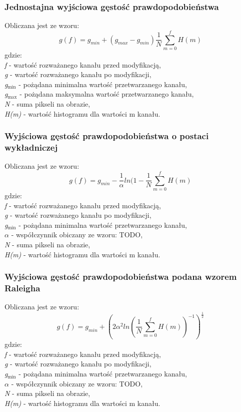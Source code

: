\documentclass{classrep}
\begin{document}
\subsubsection{Jednostajna wyjściowa gęstość prawdopodobieństwa}
Obliczana jest ze wzoru:
\[ g(f) = g_{min} + (g_{max} - g_{min}) \frac{1}{N} \displaystyle\sum_{m=0}^{f} H(m) \]
gdzie:\\
\textit{f} - wartość rozważanego kanału przed modyfikacją,\\
\textit{g} - wartość rozważanego kanału po modyfikacji,\\
\textit{g$_{\text{min}}$} - pożądana minimalna wartość przetwarzanego kanału,\\
\textit{g$_{\text{max}}$} - pożądana maksymalna wartość przetwarzanego kanału,\\
\textit{N} - suma pikseli na obrazie,\\
\textit{H(m)} - wartość histogramu dla wartości m kanału.\\

\subsubsection{Wyjściowa gęstość prawdopodobieństwa o postaci wykładniczej}
Obliczana jest ze wzoru:
\[ g(f) = g_{min} - \frac{1}{\alpha} ln (1 - \frac{1}{N} \displaystyle\sum_{m=0}^{f} H(m) \]
gdzie:\\
\textit{f} - wartość rozważanego kanału przed modyfikacją,\\
\textit{g} - wartość rozważanego kanału po modyfikacji,\\
\textit{g$_{\text{min}}$} - pożądana minimalna wartość przetwarzanego kanału,\\
\textit{$\alpha$} - współczynnik obiczany ze wzoru: TODO,\\
\textit{N} - suma pikseli na obrazie,\\
\textit{H(m)} - wartość histogramu dla wartości m kanału.\\

\subsubsection{Wyjściowa gęstość prawdopodobieństwa podana wzorem Raleigha}
Obliczana jest ze wzoru:
\[ g(f) = g_{min} + (2 \alpha^2 ln (\frac{1}{N} \displaystyle\sum_{m=0}^{f} H(m))^{-1})^\frac{1}{2} \]
gdzie:\\
\textit{f} - wartość rozważanego kanału przed modyfikacją,\\
\textit{g} - wartość rozważanego kanału po modyfikacji,\\
\textit{g$_{\text{min}}$} - pożądana minimalna wartość przetwarzanego kanału,\\
\textit{$\alpha$} - współczynnik obiczany ze wzoru: TODO,\\
\textit{N} - suma pikseli na obrazie,\\
\textit{H(m)} - wartość histogramu dla wartości m kanału.\\
\end{document}
